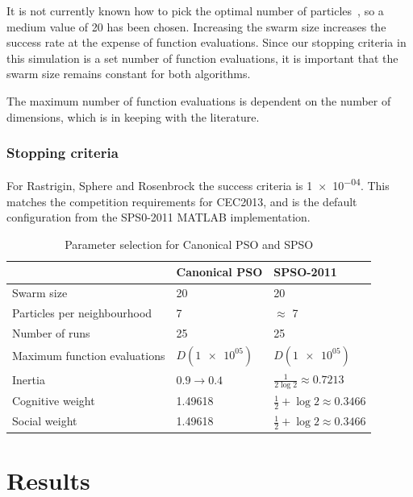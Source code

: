 \documentclass{csfourzero}
\begin{document}
It is not currently known how to pick the optimal number of
particles~\cite{Trelea:2003dv}, so a medium value of 20 has been chosen.
Increasing the swarm size increases the success rate at the expense of function
evaluations. Since our stopping criteria in this simulation is a set number of
function evaluations, it is important that the swarm size remains constant for
both algorithms.

The maximum number of function evaluations is dependent on the number of
dimensions, which is in keeping with the literature.

\subsubsection{Stopping criteria}

For Rastrigin, Sphere and Rosenbrock the success criteria is \num{1e-04}. This
matches the competition requirements for CEC2013, and is the default
configuration from the SPS0-2011 MATLAB implementation.

\begin{table}
\centering
  \begin{tabular}{lll}
  \hline
                                & Canonical PSO         & SPSO-2011 \\ \hline
  Swarm size                    & 20                    & 20 \\
  Particles per neighbourhood   & 7                     & $\approx$ 7 \\
  Number of runs                & 25                    & 25 \\
  Maximum function evaluations  & $D(\num{1e+05})$      & $D(\num{1e+05})$ \\
  Inertia                       & $0.9 \rightarrow 0.4$ & $\frac{1}{2\log{2}} \approx 0.7213$ \\
  Cognitive weight              & 1.49618               & $\frac{1}{2} + \log{2} \approx 0.3466$ \\
  Social weight                 & 1.49618               & $\frac{1}{2} + \log{2} \approx 0.3466$ \\
  \end{tabular}
  \caption{Parameter selection for Canonical PSO and SPSO}
  \label{tab:parameters}
\end{table}

\section{Results}
\end{document}
